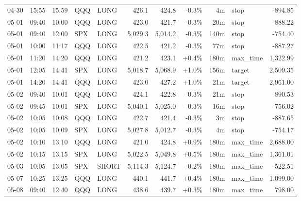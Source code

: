 \documentclass[11pt,a4paper,twoside]{article}
\begin{document}
\begin{center}
\begin{longtable}{>{\color{txtmain}}l l l l l r r r r >{\color{txtmain}}l r}
04-30 & 15:55 & 15:59 & QQQ & LONG & 426.1 & 424.8 & \textcolor{lossred}{-0.3\%} & 4m & stop & \textcolor{lossred}{-894.85} \\
05-01 & 09:40 & 10:00 & QQQ & LONG & 423.0 & 421.7 & \textcolor{lossred}{-0.3\%} & 20m & stop & \textcolor{lossred}{-888.22} \\
05-01 & 09:40 & 12:00 & SPX & LONG & 5,029.3 & 5,014.2 & \textcolor{lossred}{-0.3\%} & 140m & stop & \textcolor{lossred}{-754.40} \\
05-01 & 10:00 & 11:17 & QQQ & LONG & 422.5 & 421.2 & \textcolor{lossred}{-0.3\%} & 77m & stop & \textcolor{lossred}{-887.27} \\
05-01 & 11:20 & 14:20 & QQQ & LONG & 421.2 & 423.1 & \textcolor{wingreen}{+0.4\%} & 180m & max\_time & \textcolor{wingreen}{1,322.99} \\
05-01 & 12:05 & 14:41 & SPX & LONG & 5,018.7 & 5,068.9 & \textcolor{wingreen}{+1.0\%} & 156m & target & \textcolor{wingreen}{2,509.35} \\
05-01 & 14:20 & 14:41 & QQQ & LONG & 423.0 & 427.2 & \textcolor{wingreen}{+1.0\%} & 21m & target & \textcolor{wingreen}{2,961.00} \\
05-02 & 09:40 & 10:01 & QQQ & LONG & 424.1 & 422.8 & \textcolor{lossred}{-0.3\%} & 21m & stop & \textcolor{lossred}{-890.53} \\
05-02 & 09:45 & 10:01 & SPX & LONG & 5,040.1 & 5,025.0 & \textcolor{lossred}{-0.3\%} & 16m & stop & \textcolor{lossred}{-756.02} \\
05-02 & 10:05 & 10:08 & QQQ & LONG & 422.7 & 421.4 & \textcolor{lossred}{-0.3\%} & 3m & stop & \textcolor{lossred}{-887.65} \\
05-02 & 10:05 & 10:09 & SPX & LONG & 5,027.8 & 5,012.7 & \textcolor{lossred}{-0.3\%} & 4m & stop & \textcolor{lossred}{-754.17} \\
05-02 & 10:10 & 13:10 & QQQ & LONG & 421.0 & 424.8 & \textcolor{wingreen}{+0.9\%} & 180m & max\_time & \textcolor{wingreen}{2,688.00} \\
05-02 & 10:15 & 13:15 & SPX & LONG & 5,022.5 & 5,049.8 & \textcolor{wingreen}{+0.5\%} & 180m & max\_time & \textcolor{wingreen}{1,361.01} \\
05-03 & 10:05 & 13:05 & SPX & SHORT & 5,114.3 & 5,124.7 & \textcolor{lossred}{-0.2\%} & 180m & max\_time & \textcolor{lossred}{-522.51} \\
05-07 & 10:25 & 13:25 & QQQ & LONG & 440.1 & 441.7 & \textcolor{wingreen}{+0.4\%} & 180m & max\_time & \textcolor{wingreen}{1,099.00} \\
05-08 & 09:40 & 12:40 & QQQ & LONG & 438.6 & 439.7 & \textcolor{wingreen}{+0.3\%} & 180m & max\_time & \textcolor{wingreen}{798.00} \\

\end{longtable}
\end{center}
\end{document}
